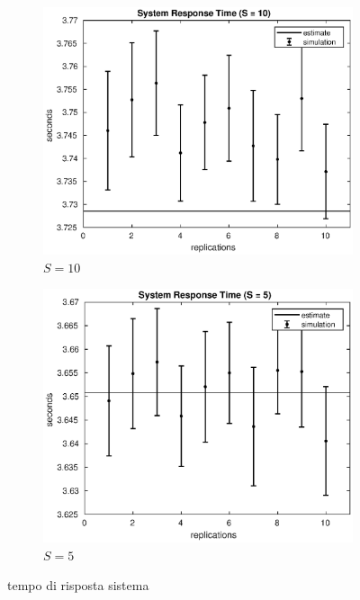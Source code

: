\begin{figure}[!h]
\begin{subfigure}[t]{0.49\textwidth}
\includegraphics[width=\textwidth]{figures/simul/10_500K_s}
\caption{$S = 10$}
\label{10_s}
\end{subfigure}
%
\begin{subfigure}[t]{0.49\textwidth}
\includegraphics[width=\textwidth]{figures/simul/5_500K_s}
\caption{$S = 5$}
\label{5_s}
\end{subfigure}
%
\caption{tempo di risposta sistema}
\label{plot:s}
\end{figure}
%
%

